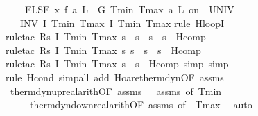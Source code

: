 \documentclass[envcountsame]{llncs}
\begin{document}
\begin{example}
\begin{isabellebody}
\ \ \ \ ELSE\ {\isacharparenleft}x{\isasymacute}{\isacharequal}\ f\ a\ L\ {\isacharampersand}\ G\ Tmin\ Tmax\ a\ L\ on\ {\isacharbraceleft}{}{\isachardot}{\isachardot}{\isasymtau}{\isacharbraceright}\ UNIV\ {\isacharat}\ {}{\isacharparenright}{\isacharparenright}\isanewline
\ \ {\isacharparenright}\ INV\ I\ Tmin\ Tmax{\isacharparenright}\ {\isasymlceil}I\ Tmin\ Tmax{\isasymrceil}{\isachardoublequoteclose}\isanewline
{}\isamarkupfalse%
{\isacharparenleft}rule\ H{\isacharunderscore}loopI{\isacharparenright}\isanewline
\ \ \ \ \isamarkupfalse%
{\isacharparenleft}rule{\isacharunderscore}tac\ R{\isacharequal}{\isachardoublequoteopen}{\isasymlambda}s{\isachardot}\ I\ Tmin\ Tmax\ s\ {\isasymand}\ s{\isachardollar}{}{\isacharequal}{}\ {\isasymand}\ s{\isachardollar}{}\ {\isacharequal}\ s{\isachardollar}{}{\isachardoublequoteclose}\ \ H{\isacharunderscore}comp{\isacharparenright}\isanewline
\ \ \ \ \ \isamarkupfalse%
{\isacharparenleft}rule{\isacharunderscore}tac\ R{\isacharequal}{\isachardoublequoteopen}{\isasymlambda}s{\isachardot}\ I\ Tmin\ Tmax\ s{\isasymand}\ s{\isachardollar}{}{\isacharequal}{}\ {\isasymand}\ s{\isachardollar}{}\ {\isacharequal}\ s{\isachardollar}{}{\isachardoublequoteclose}\ \ H{\isacharunderscore}comp{\isacharparenright}\isanewline
\ \ \ \ \ \ \isamarkupfalse%
{\isacharparenleft}rule{\isacharunderscore}tac\ R{\isacharequal}{\isachardoublequoteopen}{\isasymlambda}s{\isachardot}\ I\ Tmin\ Tmax\ s\ {\isasymand}\ s{\isachardollar}{}{\isacharequal}{}{\isachardoublequoteclose}\ \ H{\isacharunderscore}comp{\isacharcomma}\ simp{\isacharcomma}\ simp{\isacharparenright}\isanewline
\ \ \ \ \ \ \isamarkupfalse%
{\isacharparenleft}rule\ H{\isacharunderscore}cond{\isacharcomma}\ simp{\isacharunderscore}all\ add{\isacharcolon}\ Hoare{\isacharunderscore}therm{\isacharunderscore}dyn{\isacharbrackleft}OF\ assms{\isacharparenleft}{}{\isacharcomma}{}{\isacharparenright}{\isacharbrackright}{\isacharparenright}{\isacharplus}\isanewline
\ \ \isamarkupfalse%
\ therm{\isacharunderscore}dyn{\isacharunderscore}up{\isacharunderscore}real{\isacharunderscore}arith{\isacharbrackleft}OF\ assms{\isacharparenleft}{}{\isacharparenright}\ {\isacharunderscore}\ {\isacharunderscore}\ assms{\isacharparenleft}{}{\isacharparenright}{\isacharcomma}\ of\ Tmin{\isacharbrackright}\isanewline
\ \ \ \ \ therm{\isacharunderscore}dyn{\isacharunderscore}down{\isacharunderscore}real{\isacharunderscore}arith{\isacharbrackleft}OF\ assms{\isacharparenleft}{}{\isacharcomma}{}{\isacharparenright}{\isacharcomma}\ of\ {\isacharunderscore}\ Tmax{\isacharbrackright}\ \isamarkupfalse%
\ auto\isanewline
\end{isabellebody}


\end{example}
\end{document}
